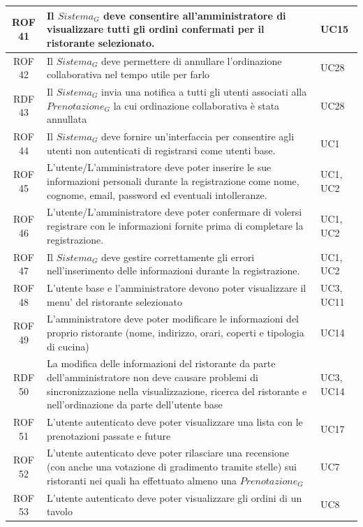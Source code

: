\documentclass[12pt, oneside]{article}
\begin{document}
\begin{longtable}{|c|p{14cm}|p{2cm}|}
    \hline
    ROF 41 & Il $\textit{Sistema}_G$ deve consentire all'amministratore di visualizzare tutti gli ordini confermati per il ristorante selezionato. & UC15 \\
    \hline
    ROF 42 & Il $\textit{Sistema}_G$ deve permettere di annullare l'ordinazione collaborativa nel tempo utile per farlo & UC28 \\
    \hline
    RDF 43 & Il $\textit{Sistema}_G$ invia una notifica a tutti gli utenti associati alla $\textit{Prenotazione}_G$ la cui ordinazione collaborativa è stata annullata & UC28 \\
    \hline
    ROF 44 & Il $\textit{Sistema}_G$ deve fornire un'interfaccia per consentire agli utenti non autenticati di registrarsi come utenti base. & UC1 \\
    \hline
    ROF 45 & L'utente/L'amministratore deve poter inserire le sue informazioni personali durante la registrazione come nome, cognome, email, password ed eventuali intolleranze. & UC1, UC2 \\
    \hline
    ROF 46 & L'utente/L'amministratore deve poter confermare di volersi registrare con le informazioni fornite prima di completare la registrazione. & UC1, UC2 \\
    \hline
    ROF 47 & Il $\textit{Sistema}_G$ deve gestire correttamente gli errori nell'inserimento delle informazioni durante la registrazione. & UC1, UC2 \\
    \hline 
    ROF 48 & L'utente base e l'amministratore devono poter visualizzare il menu' del ristorante selezionato & UC3, UC11\\
    \hline
    ROF 49 & L'amministratore deve poter modificare le informazioni del proprio ristorante (nome, indirizzo, orari, coperti e tipologia di cucina) & UC14\\
    \hline
    RDF 50 & La modifica delle informazioni del ristorante da parte dell'amministratore non deve causare problemi di sincronizzazione nella visualizzazione, ricerca del ristorante e nell'ordinazione da parte dell'utente base & UC3, UC14 \\
    \hline
    ROF 51 & L'utente autenticato deve poter visualizzare una lista con le prenotazioni passate e future & UC17 \\
    \hline
    ROF 52 & L'utente autenticato deve poter rilasciare una recensione (con anche una votazione di gradimento tramite stelle) sui ristoranti nei quali ha effettuato almeno una $\textit{Prenotazione}_G$ & UC7 \\
    \hline
    ROF 53 & L'utente autenticato deve poter visualizzare gli ordini di un tavolo & UC8 \\

\end{longtable}
\end{document}
